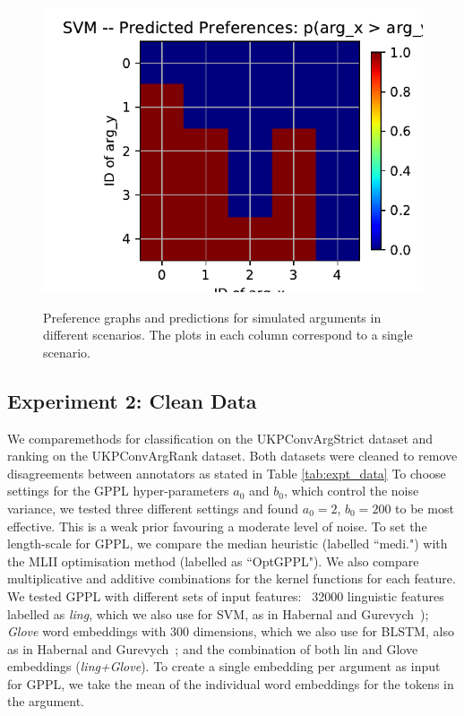 \begin{figure}
{%
  \includegraphics[width=0.56\columnwidth, clip=True, trim=58 5 10 24]{figures/cycles_demo/undecided/SVM_probas} 
}
\caption{Preference graphs and predictions for simulated arguments in different scenarios. The plots in each column correspond to a single scenario.}
\end{figure}

\subsection{Experiment 2: Clean Data}

We comparemethods for classification on the UKPConvArgStrict dataset and ranking on the UKPConvArgRank dataset. 
Both datasets were cleaned to remove disagreements between annotators as stated in Table \ref{tab:expt_data}
To choose settings for the GPPL hyper-parameters $a_0$ and $b_0$, which control
the noise variance, we tested three different settings and found $a_0=2$, $b_0=200$
to be most effective. This is a weak prior favouring a moderate level of noise.
To set the length-scale for GPPL, we compare the median heuristic (labelled ``medi.")
with the MLII optimisation method (labelled as ``OptGPPL").
We also compare multiplicative and additive combinations for the kernel functions for each feature.
We tested GPPL with different sets of input features:
~32000 linguistic features labelled as \emph{ling}, which 
we also use for SVM, as in Habernal and Gurevych~);
\emph{Glove} word embeddings with 300 dimensions, which we also use for BLSTM, also as in Habernal and Gurevych~;
and the combination of both lin and Glove embeddings (\emph{ling+Glove}). 
To create a single embedding per argument as input for GPPL,
we take the mean of the individual word embeddings for the tokens in the argument.

